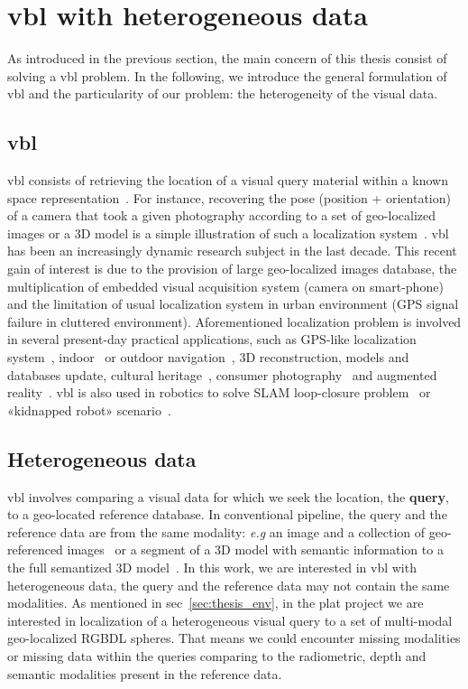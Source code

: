 \section{\Acl*{vbl} with heterogeneous data}

As introduced in the previous section, the main concern of this thesis consist of solving a \ac{vbl} problem. In the following, we introduce the general formulation of \ac{vbl} and the particularity of our problem: the heterogeneity of the visual data.

\subsection{\Acl*{vbl}}
	\Ac{vbl} consists of retrieving the location of a visual query material within a known space representation~\citep{Zamir2016, Piasco2017, Brejcha2017}. For instance, recovering the pose (position + orientation) of a camera that took a given photography according to a set of geo-localized images or a 3D model is a simple illustration of such a localization system~\citep{Kendall2015, Sattler2016a}. \ac{vbl} has been an increasingly dynamic research subject in the last decade. This recent gain of interest is due to the provision of large geo-localized images database, the multiplication of embedded visual acquisition system (\eg camera on smart-phone) and the limitation of usual localization system in urban environment (\eg GPS signal failure in cluttered environment). Aforementioned localization problem is involved in several present-day practical applications, such as GPS-like localization system~\citep{Armagan2017b}, indoor~\citep{Cavallari2018} or outdoor navigation~\citep{Brahmbhatt2017}, 3D reconstruction, models and databases update, cultural heritage~\citep{Bhowmik2017}, consumer photography~\citep{Hays2008, Weyand2016} and augmented reality~\citep{Glocker2013}. \Ac{vbl} is also used in robotics to solve SLAM loop-closure problem~\citep{Garg2018a} or «kidnapped robot» scenario~\citep{Cupec}.
		
\subsection{Heterogeneous data}
	\Ac{vbl} involves comparing a visual data for which we seek the location, the \textbf{query}, to a geo-located reference database. In conventional pipeline, the query and the reference data are from the same modality: \textit{e.g} an image and a collection of geo-referenced images~\citep{Arandjelovic2014, Arandjelovic2016} or a segment of a 3D model with semantic information to a the full semantized 3D model~\citep{Schonberger2017a}. In this work, we are interested in \ac{vbl} with heterogeneous data, \ie the query and the reference data may not contain the same modalities. As mentioned in \acl{sec}~\ref{sec:thesis_env}, in the \ac{plat} project we are interested in localization of a heterogeneous visual query to a set of multi-modal geo-localized RGBDL spheres. That means we could encounter missing modalities or missing data within the queries comparing to the radiometric, depth and semantic modalities present in the reference data.